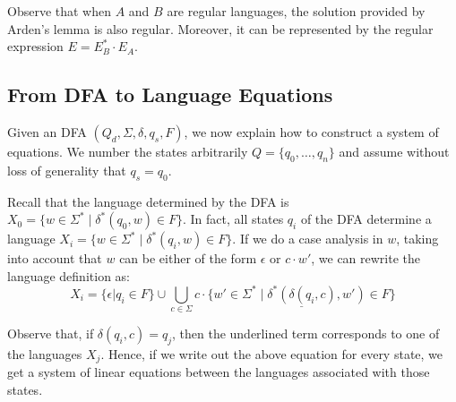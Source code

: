 Observe that when $A$ and $B$ are regular languages, the solution provided by Arden's lemma is
also regular. Moreover, it can be represented by the regular expression $E = E_B^* \cdot E_A$.

\subsection{From DFA to Language Equations}

Given an DFA $(Q_d,\Sigma,\delta,q_{s},F)$, we now explain how to construct a system of equations.
We number the states arbitrarily $Q = \{ q_0, \ldots, q_n\}$ and assume without loss of generality
that $q_s = q_0$.

Recall that the language determined by the DFA is $X_0 = \{ w \in \Sigma^* \mid \delta^*(q_0, w) \in F\}$.
In fact, all states $q_i$ of the DFA determine a language $X_i = \{ w \in \Sigma^* \mid \delta^*(q_i, w) \in F\}$.
If we do a case analysis in $w$, taking into account that $w$ can be either of the form $\epsilon$ or $c \cdot w'$,
we can rewrite the language definition as:
\begin{equation*}
X_i = \{ \epsilon | q_i \in F\} \cup \bigcup_{c \in \Sigma} c \cdot \underline{\{  w ' \in \Sigma^* \mid \delta^*(\delta(q_i,c), w') \in F\}}
\end{equation*}

Observe that, if $\delta(q_i,c) = q_j$, then the underlined term corresponds to one of the languages $X_j$. Hence,
if we write out the above equation for every state, we get a system of linear equations between the languages
associated with those states. 

